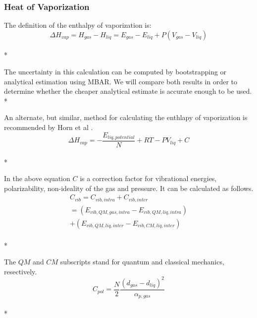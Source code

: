\documentclass[aps,pre,nofootinbib,superscriptaddress,linenumbers,10pt, draft,tightenlines]{revtex4-1}
\begin{document}
\begin{itemize}
\begin{itemize}
    	\subsubsection{Heat of Vaporization}

        The definition of the enthalpy of vaporization is:
        \begin{equation}\Delta H_{vap} = H_{gas} - H_{liq} = E_{gas} - E_{liq} + P(V_{gas} - V_{liq})\end{equation}\\*
	
    	The uncertainty in this calculation can be computed by bootstrapping or analytical estimation using MBAR. We will 
    	compare both results in order to determine whether the cheaper analytical estimate is accurate enough to be used.\\*  

        An alternate, but similar, method for calculating the enthlapy of vaporization is recommended by Horn et al \cite{tip4pew}.
        \begin{equation}\Delta H_{vap} = -\frac{E_{liq, potential}}{N} + R T - P V_{liq} + C\end{equation}\\*

        In the above equation $C$ is a correction factor for vibrational energies, polarizability, non-ideality of the gas and pressure. It can be calculated as follows.
        \begin{multline}
        C_{vib} = C_{vib,intra} + C_{vib,inter} \\ = \left(E_{vib,QM,gas,intra} - E_{vib,QM,liq,intra}\right) \\ + \left(E_{vib,QM,liq,inter} - E_{vib,CM,liq,inter}\right)
        \end{multline}\\*

        The $QM$ and $CM$ subscripts stand for quantum and classical mechanics, resectively. 
        \begin{equation}C_{pol} = \frac{N}{2} \frac{\left(d_{gas} - d_{liq}\right)^2}{\alpha_{p,gas}}\end{equation}\\*


\end{itemize}
\end{itemize}
\end{document}
